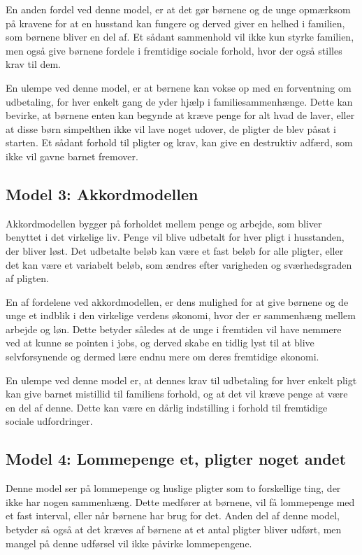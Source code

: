 En anden fordel ved denne model, er at det gør 
børnene og de unge opmærksom på kravene for at 
en husstand kan fungere og derved giver en 
helhed i familien, som børnene bliver en del af. 
Et sådant sammenhold vil ikke kun styrke 
familien, men også give børnene fordele 
i fremtidige sociale forhold, hvor der også 
stilles krav til dem.

En ulempe ved denne model, er at børnene kan 
vokse op med en forventning om udbetaling, for 
hver enkelt gang de yder hjælp i 
familiesammenhænge. Dette kan bevirke, at børnene 
enten kan begynde at kræve penge for alt hvad de 
laver, eller at disse børn simpelthen ikke vil 
lave noget udover, de pligter de blev påsat i 
starten. Et sådant forhold til pligter og krav, 
kan give en destruktiv adfærd, som ikke vil 
gavne barnet fremover.

\subsection{Model 3: Akkordmodellen}
Akkordmodellen bygger på forholdet mellem penge 
og arbejde, som bliver benyttet i det 
virkelige liv. Penge vil blive udbetalt for 
hver pligt i husstanden, der bliver løst. 
Det udbetalte beløb kan være et fast beløb 
for alle pligter, eller det kan være et 
variabelt beløb, som ændres efter varigheden
og sværhedsgraden af pligten.

En af fordelene ved akkordmodellen, er dens 
mulighed for at give børnene og de unge et 
indblik i den virkelige verdens økonomi, hvor 
der er sammenhæng mellem arbejde og løn. Dette 
betyder således at de unge i fremtiden vil have 
nemmere ved at kunne se pointen i jobs, og 
derved skabe en tidlig lyst til at blive 
selvforsynende og dermed lære endnu mere om 
deres fremtidige økonomi.

En ulempe ved denne model er, at dennes krav til 
udbetaling for hver enkelt pligt kan give 
barnet mistillid til familiens forhold, og at 
det vil kræve penge at være en del af denne. 
Dette kan være en dårlig indstilling i forhold til 
fremtidige sociale udfordringer.

\subsection{Model 4: Lommepenge et, pligter 
noget andet}
Denne model ser på lommepenge og huslige pligter 
som to forskellige ting, der ikke har 
nogen sammenhæng. Dette medfører at 
børnene, vil få lommepenge med et fast interval, 
eller når børnene har brug for det. Anden del af 
denne model, betyder så også at det kræves af 
børnene at et antal pligter bliver udført, men 
mangel på denne udførsel vil ikke påvirke 
lommepengene.

